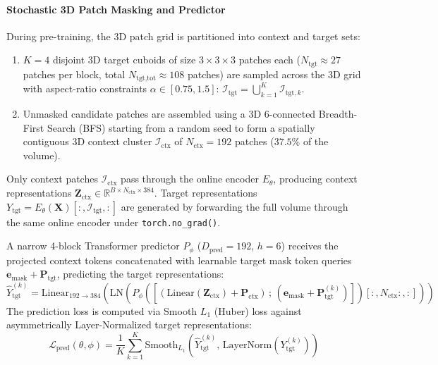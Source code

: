 \documentclass{article}
\begin{document}
\paragraph{Stochastic 3D Patch Masking and Predictor}
During pre-training, the 3D patch grid is partitioned into context and target sets:
\begin{enumerate}
    \item $K = 4$ disjoint 3D target cuboids of size $3 \times 3 \times 3$ patches each ($N_{\text{tgt}} \approx 27$ patches per block, total $N_{\text{tgt,tot}} \approx 108$ patches) are sampled across the 3D grid with aspect-ratio constraints $\alpha \in [0.75, 1.5]$: $\mathcal{I}_{\text{tgt}} = \bigcup_{k=1}^K \mathcal{I}_{\text{tgt}, k}$.
    \item Unmasked candidate patches are assembled using a 3D 6-connected Breadth-First Search (BFS) starting from a random seed to form a spatially contiguous 3D context cluster $\mathcal{I}_{\text{ctx}}$ of $N_{\text{ctx}} = 192$ patches ($37.5\%$ of the volume).
\end{enumerate}
Only context patches $\mathcal{I}_{\text{ctx}}$ pass through the online encoder $E_\theta$, producing context representations $\mathbf{Z}_{\text{ctx}} \in \mathbb{R}^{B \times N_{\text{ctx}} \times 384}$. Target representations $Y_{\text{tgt}} = E_\theta(\mathbf{X})[:, \mathcal{I}_{\text{tgt}}, :]$ are generated by forwarding the full volume through the same online encoder under \texttt{torch.no\_grad()}.

A narrow 4-block Transformer predictor $P_\phi$ ($D_{\text{pred}} = 192$, $h = 6$) receives the projected context tokens concatenated with learnable target mask token queries $\mathbf{e}_{\text{mask}} + \mathbf{P}_{\text{tgt}}$, predicting the target representations:
\begin{equation}
    \hat{Y}_{\text{tgt}}^{(k)} = \text{Linear}_{192 \to 384}\left(\text{LN}\left(P_\phi\left(\left[(\text{Linear}(\mathbf{Z}_{\text{ctx}}) + \mathbf{P}_{\text{ctx}}) \,;\, (\mathbf{e}_{\text{mask}} + \mathbf{P}_{\text{tgt}}^{(k)})\right]\right)[:, N_{\text{ctx}}:, :]\right)\right)
\end{equation}
The prediction loss is computed via Smooth $L_1$ (Huber) loss against asymmetrically Layer-Normalized target representations:
\begin{equation}
    \mathcal{L}_{\text{pred}}(\theta, \phi) = \frac{1}{K} \sum_{k=1}^K \text{Smooth}_{L_1}\left(\hat{Y}_{\text{tgt}}^{(k)}, \, \text{LayerNorm}(Y_{\text{tgt}}^{(k)})\right)
\end{equation}
\end{document}
